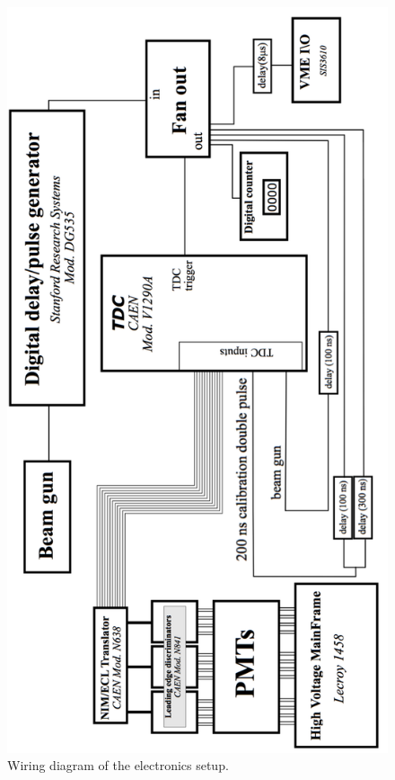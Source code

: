 \begin{figure}[h]
\centering
\includegraphics[width=\FigWiringDiagramSize\textwidth, angle=\WireAngle]{WiringDiagram.png}
\caption{Wiring diagram of the electronics setup. }
\label{fig:WiringDiagram}
\end{figure}
\figWiringDiagramBarrier
